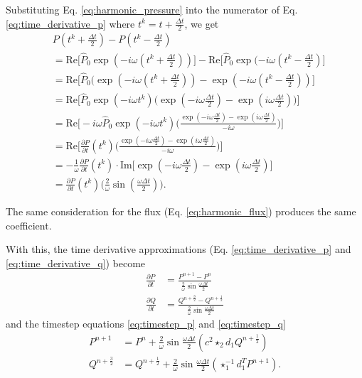\documentclass[utf8,english]{gradu3}
\begin{document}
Substituting Eq. \eqref{eq:harmonic_pressure}
into the numerator of Eq. \eqref{eq:time_derivative_p}
where $t^k = t + \frac{\Delta t}{2}$, we get
\begin{align*}
& P(t^k + \frac{\Delta t}{2}) - P(t^k - \frac{\Delta t}{2}) \\
&= \text{Re} \Big[ \hat{P}_0 \exp(-i\omega (t^k + \frac{\Delta t}{2})) \Big]
- \text{Re} \Big[ \hat{P}_0 \exp(-i\omega (t^k - \frac{\Delta t}{2}) \Big] \\
&= \text{Re} \Big[ \hat{P}_0 (\exp(-i\omega (t^k + \frac{\Delta t}{2}))
- \exp(-i\omega (t^k - \frac{\Delta t}{2})) \Big] \\
&= \text{Re} \Big[ \hat{P}_0 \exp(-i\omega t^k)
\Big( \exp(-i\omega \frac{\Delta t}{2}) - \exp(i\omega \frac{\Delta t}{2}) \Big) \Big] \\
&= \text{Re} \Big[ -i\omega \hat{P}_0 \exp(-i\omega t^k)
\Big(\frac{\exp(-i\omega \frac{\Delta t}{2}) - \exp(i\omega \frac{\Delta t}{2})}{-i\omega}\Big) \Big] \\
&= \text{Re} \Big[ \frac{\partial P}{\partial t}(t^k)
\Big(\frac{\exp(-i\omega \frac{\Delta t}{2}) - \exp(i\omega \frac{\Delta t}{2})}{-i\omega}\Big) \Big] \\
&= - \frac{1}{\omega} \frac{\partial P}{\partial t}(t^k)
\cdot \text{Im} \Big[\exp(-i\omega \frac{\Delta t}{2}) - \exp(i\omega \frac{\Delta t}{2}) \Big] \\
&= \frac{\partial P}{\partial t}(t^k) \Big(\frac{2}{\omega} \sin(\frac{\omega \Delta t}{2}) \Big).
\end{align*}

The same consideration for the flux (Eq. \eqref{eq:harmonic_flux})
produces the same coefficient.

With this, the time derivative approximations (Eq. \eqref{eq:time_derivative_p}
and \eqref{eq:time_derivative_q}) become
\begin{align}
\label{eq:time_derivative_p_har}
\frac{\partial P}{\partial t}
&= \frac{P^{n+1} - P^n}{\frac{2}{\omega}\sin\frac{\omega \Delta t}{2}} \\
\label{eq:time_derivative_q_har}
\frac{\partial Q}{\partial t}
&= \frac{Q^{n+\frac{3}{2}} - Q^{n+\frac{1}{2}}}{\frac{2}{\omega}\sin\frac{\omega \Delta t}{2}}
\end{align}
and the timestep equations \eqref{eq:timestep_p} and \eqref{eq:timestep_q}
\begin{align}
\label{eq:timestep_p_har}
P^{n+1} &= P^n
+ \frac{2}{\omega}\sin\frac{\omega \Delta t}{2} (c^2 \star_2 d_1 Q^{n+\frac{1}{2}}) \\
\label{eq:timestep_q_har}
Q^{n+\frac{3}{2}} &= Q^{n+\frac{1}{2}}
+ \frac{2}{\omega}\sin\frac{\omega \Delta t}{2} (\star_1^{-1} d_1^T P^{n+1}).
\end{align}
\end{document}
